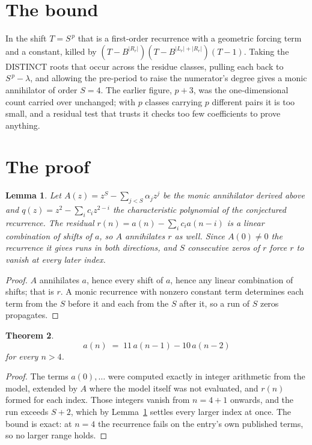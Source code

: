 \documentclass[11pt,a4paper]{article}
\theoremstyle{plain}
\newtheorem{theorem}{Theorem}
\newtheorem{lemma}[theorem]{Lemma}
\theoremstyle{definition}
\begin{document}
\section{The bound}

In the shift $T=S^{\,p}$ that is a first-order recurrence with a geometric forcing term and a
constant, killed by $(T-B^{|R_r|})(T-B^{|L_r|+|R_r|})(T-1)$. Taking the DISTINCT roots that
occur across the residue classes, pulling each back to $S^{\,p}-\lambda$, and allowing the
pre-period to raise the numerator's degree gives a monic annihilator of order $S=4$. The
earlier figure, $p+3$, was the one-dimensional count carried over unchanged; with $p$ classes
carrying $p$ different pairs it is too small, and a residual test that trusts it checks too few
coefficients to prove anything.

\section{The proof}

\begin{lemma}\label{lem:crit}
Let $A(z)=z^S-\sum_{j<S}\alpha_jz^{j}$ be the monic annihilator derived above and
$q(z)=z^{2}-\sum_ic_iz^{2-i}$ the characteristic polynomial of the conjectured
recurrence. The residual $r(n)=a(n)-\sum_ic_ia(n-i)$ is a linear combination of shifts of $a$,
so $A$ annihilates $r$ as well. Since $A(0)\ne0$ the recurrence it gives runs in both
directions, and $S$ consecutive zeros of $r$ force $r$ to vanish at every later index.
\end{lemma}

\begin{proof}
$A$ annihilates $a$, hence every shift of $a$, hence any linear combination of shifts; that is
$r$. A monic recurrence with nonzero constant term determines each term from the $S$ before it
and each from the $S$ after it, so a run of $S$ zeros propagates.
\end{proof}

\begin{theorem}
\[
a(n)\;=\;11\,a(n-1) - 10\,a(n-2)
\]
for every $n>4$.
\end{theorem}

\begin{proof}
The terms $a(0),\dots$ were computed exactly in integer arithmetic from the model, extended by
$A$ where the model itself was not evaluated, and $r(n)$ formed for each index. Those integers
vanish from $n=4+1$ onwards, and the run exceeds $S+2$, which by
Lemma~\ref{lem:crit} settles every larger index at once. The bound is exact: at $n=4$ the recurrence fails on the entry's own published terms, so no larger range holds.
\end{proof}
\end{document}
